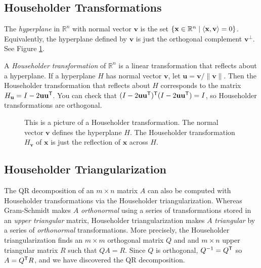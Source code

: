 \subsection*{Householder Transformations}
The \emph{hyperplane} in $\mathbb{R}^n$ with normal vector $\mathbf{v}$ is the set $\{ {\bf x} \in \mathbb{R}^n \mid \langle {\bf x}, \mathbf{v} \rangle = 0 \}$. 
Equivalently, the hyperplane defined by $\mathbf{v}$ is just the orthogonal complement $\mathbf{v}^{\perp}$. 
See Figure \ref{fig:Householder_reflector}.

A \emph{Householder transformation} of $\mathbb{R}^n$ is a linear transformation that reflects about a hyperplane. 
If a hyperplane $H$ has normal vector $\mathbf{v}$, let $\mathbf{u} = \mathbf{v}/\|\mathbf{v}\|$. 
Then the Householder transformation that reflects about $H$ corresponds to the matrix $H_{\mathbf{u}} = I - 2 \mathbf{u}\mathbf{u}^{\mathsf T}$. 
You can check that $(I - 2 \mathbf{u}\mathbf{u}^{\mathsf T})^{\mathsf T}(I - 2 \mathbf{u}\mathbf{u}^{\mathsf T})=I$, so Householder transformations are orthogonal.

\begin{figure}
\begin{center}
\end{center}
\caption{This is a picture of a Householder transformation. 
The normal vector $\mathbf{v}$ defines the hyperplane $H$. 
The Householder transformation $H_{\mathbf{v}}$ of $\mathbf{x}$ is just the reflection of $\mathbf{x}$ across $H$.}
\label{fig:Householder_reflector}
\end{figure}

\subsection*{Householder Triangularization}
The QR decomposition of an $m \times n$ matrix $A$ can also be computed with Householder transformations via the Householder triangularization.
Whereas Gram-Schmidt makes $A$ \emph{orthonormal} using a series of transformations stored in an \emph{upper triangular} matrix, Householder triangularization makes $A$ \emph{triangular} by a series of \emph{orthonormal} transformations.
More precisely, the Householder triangularization finds an $m \times m$ orthogonal matrix $Q$ and and $m \times n$ upper triangular matrix $R$ such that $QA = R$. 
Since $Q$ is orthogonal, $Q^{-1}=Q^{\mathsf T}$ so $A = Q^{\mathsf T} R$, and we have discovered the QR decomposition.

